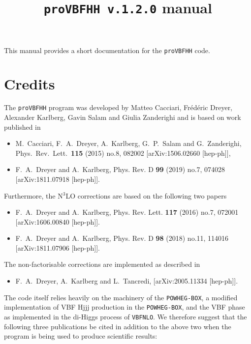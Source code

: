 \documentclass[12pt,a4]{article}
\title{\texttt{proVBFHH v.1.2.0} manual}
\newcommand{\provbfhh}{\texttt{proVBFHH}\xspace}
\begin{document}
\maketitle

This manual provides a short documentation for the \provbfhh code.

\tableofcontents

\section{Credits}
The \provbfhh program was developed by Matteo Cacciari, Fr\'ed\'eric
Dreyer, Alexander Karlberg, Gavin Salam and Giulia Zanderighi and is
based on work published in

\begin{itemize}
\item M.~Cacciari, F.~A.~Dreyer, A.~Karlberg, G.~P.~Salam and G.~Zanderighi,
  Phys.\ Rev.\ Lett.\  {\bf 115} (2015) no.8,  082002
  [arXiv:1506.02660 [hep-ph]],
\item F.~A.~Dreyer and A.~Karlberg,
  Phys. Rev. D \textbf{99} (2019) no.7, 074028
  [arXiv:1811.07918 [hep-ph]].
\end{itemize}
Furthermore, the N$^3$LO corrections are based on the following two papers
\begin{itemize}
\item F.~A.~Dreyer and A.~Karlberg,
  Phys. Rev. Lett. \textbf{117} (2016) no.7, 072001
  [arXiv:1606.00840 [hep-ph]].
\item F.~A.~Dreyer and A.~Karlberg,
  Phys. Rev. D \textbf{98} (2018) no.11, 114016
  [arXiv:1811.07906 [hep-ph]].
\end{itemize}
%
The non-factorisable corrections are implemented as described in
\begin{itemize}
\item F.~A.~Dreyer, A.~Karlberg and L.~Tancredi,
  [arXiv:2005.11334 [hep-ph]].
\end{itemize}
%
The code itself relies heavily on the machinery of the
\texttt{POWHEG-BOX}, a modified implementation of VBF Hjjj production in the
\texttt{POWHEG-BOX}, and the VBF phase as implemented in the di-Higgs
process of \texttt{VBFNLO}.
%
We therefore suggest that the following three publications be cited in
addition to the above two when the program is being used to produce
scientific results:
\end{document}
